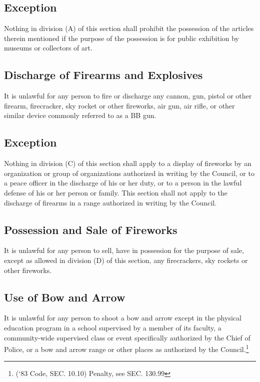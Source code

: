 \subsection{Exception}
Nothing in division (A) of this section shall prohibit the possession of the articles therein mentioned if the purpose of the possession is for public exhibition by museums or collectors of art.
\subsection{Discharge of Firearms and Explosives}
It is unlawful for any person to fire or discharge any cannon, gun, pistol or other firearm, firecracker, sky rocket or other fireworks, air gun, air rifle, or other similar device commonly referred to as a BB gun.
\subsection{Exception}
Nothing in division (C) of this section shall apply to a display of fireworks by an organization or group of organizations authorized in writing by the Council, or to a peace officer in the discharge of his or her duty, or to a person in the lawful defense of his or her person or family.  This section shall not apply to the discharge of firearms in a range authorized in writing by the Council.
\subsection{Possession and Sale of Fireworks}
It is unlawful for any person to sell, have in possession for the purpose of sale, except as allowed in division (D) of this section, any firecrackers, sky rockets or other fireworks.
\subsection{Use of Bow and Arrow}
It is unlawful for any person to shoot a bow and arrow except in the physical education program in a school supervised by a member of its faculty, a community-wide supervised class or event specifically authorized by the Chief of Police, or a bow and arrow range or other places as authorized by the Council.\footnote{(‘83 Code, SEC. 10.10)  Penalty, see SEC. 130.99}

